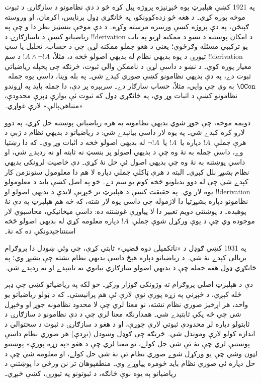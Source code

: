 \documentclass[../../../include/open-logic-section]{subfiles}
\begin{document}
په 1921 کښې هېلبرټ يوه څېړنيزه پروژه پيل کړه څو د دې نظامونو د
سازګارۍ د ثبوت موخه پوره کړي۔ د هغه څو زده‌کوونکو، په ځانګړي ډول
برنايس، اکرمان، او وروسته ګېنڅن، په دې پروژه کښې ورسره مرسته وکړه۔
د دې موخې بنسټيز نظر دا و چې په رياضياتو کښې د ناسازګارۍ د
!!{derivation} د امکان پوښتنه د نښو د ممکنه لړيو په باب يو
ترکيبي مسئله وګرځوي؛ يعنې د هغو جملو ممکنه لړۍ چې د حساب، تحليل يا
سټ تيورۍ د يوه بديهي نظام له بديهي اصولو څخه د، مثلاً،
$!A \land \lnot !A$ د سم !!{derivation} معيار پوره کوي۔ د نښو د
داسې لړۍ د ناممکن والي ثبوت، څرنګه چې پخپله رياضياتي ثبوت دے، په دې
بديهي نظامونو کښې صوري کېدے شي۔ په بله وينا، داسې يوه جمله~$\OCon$
به وي چې وايي، مثلاً، حساب سازګار دے۔ سربېره پر دې، دا جمله بايد په
اړوندو نظامونو کښې د اثبات وړ وي، په ځانګړي ډول که ثبوت ئې يوازې ډېرې
محدودې، «متناهي‌پالې» لارې غواړي۔

دويمه موخه، چې جوړ شوي بديهي نظامونه به هره رياضياتي پوښتنه حل کړي،
په دوو لارو کره کېدے شي۔ په يوه لار داسې بيانېدے شي: د رياضياتو د
بديهي نظام د ژبې د هرې جملې~$!A$ دپاره يا~$!A$ يا~$\lnot !A$ له
بديهي اصولو څخه د اثبات وړ وي۔ که دا رښتيا وے، داسې جمله به نۀ وه چې
د بديهي اصولو پر بنسټ نه ثابته او نه ردېدے شي، او داسې پوښتنه به نۀ
وه چې بديهي اصول ئې حل نۀ کړي۔ دې خاصيت لرونکی بديهي نظام
\emph{بشپړ} بلل کېږي۔ البته د هرې ټاکلې جملې دپاره لا هم دا معلومول
ستونزمن کار کېدے شي چې له دوو بديلونو څخه کوم يو سم دے۔ خو په اصل
کښې بايد د معلومولو يوه لار وي۔ په حقيقت کښې د هېلبرټ تر څېړنې لاندې
د بديهي اصولو او !!{derivation} نظامونو دپاره بشپړتيا دا لازموله چې
داسې يوه لار شته، که څه هم هېلبرټ په دې نۀ پوهېده۔ د پوښتنې دويم
تعبير دا لا پياوړې غوښتنه ده: داسې ميخانيکي، محاسبوي لار موجوده وي
چې د يوې ورکړل شوې جملې~$!A$ دپاره معلومه کړي له بديهي اصولو څخه
استنتاجېدونکې ده که نۀ۔

په 1931 کښې ګوډل د «ناتکميلۍ دوه قضيې» ثابتې کړې، چې وئې ښودل دا
پروګرام بريالی کېدے نۀ شي۔ د رياضياتو دپاره هېڅ داسې بديهي نظام نشته
چې بشپړ وي؛ په ځانګړي ډول هغه جمله چې د بديهي اصولو سازګاري بيانوي
نه ثابتېدے او نه ردېدے شي۔

دې د هېلبرټ اصلي پروګرام ته وژونکی ګوزار ورکړ۔ خو لکه په رياضياتو
کښې چې ډېر ځله کېږي، د څېړنې په زړه پورې نوې لارې ئې هم پرانيستې۔
که د ټولو رياضياتو يو واحد، هر اړخيز صوري نظام نشته، نو معنا لري چې
لا محدود نظامونه جوړ او وڅېړل شي چې څه پکې ثابتېدے شي۔ همدارنګه معنا
لري چې د دې نظامونو د سازګارۍ د ثابتولو دپاره لږ محدودې ثبوتي لارې
جوړې، او د هغو د سازګارۍ د ثبوت د سختوالي د اندازه کولو لارې وموندل
شي۔ څرنګه چې ګوډل وښودل (نږدې) هر صوري نظام داسې پوښتنې لري چې نۀ
ئې شي حل کولے، نو معنا لري چې د هغو «په زړه پورې» پوښتنو لټون وشي
چې يو ورکړل شوے صوري نظام ئې نۀ شي حل کولے، او معلومه شي چې د حل
دپاره ئې صوري نظام بايد څومره پياوړے وي۔ منطقپوهان تر نن ورځې دا
پوښتنې د رياضياتو په يوه نوې څانګه، د ثبوتونو په تيورۍ، کښې څېړي۔
\end{document}

